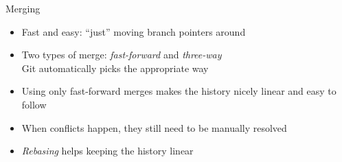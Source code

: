 \documentclass{beamer}
\begin{document}
\begin{frame}{Merging}
  \begin{itemize}
  \item Fast and easy: ``just'' moving branch pointers around
  \item Two types of merge: \emph{fast-forward} and \emph{three-way}\\Git automatically picks the appropriate way
  \item Using only fast-forward merges makes the history nicely linear and easy to follow
  \item When conflicts happen, they still need to be manually resolved
  \item \emph{Rebasing} helps keeping the history linear
  \end{itemize}
\end{frame}
\end{document}
